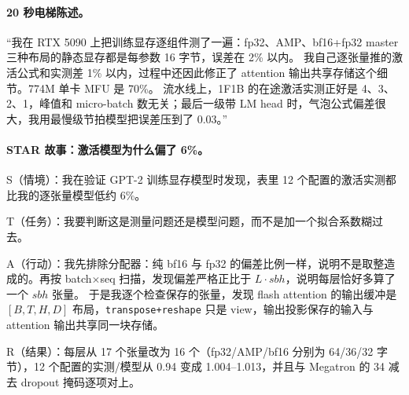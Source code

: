 \documentclass[11pt,a4paper]{ctexart}
\begin{document}
\paragraph{20 秒电梯陈述。}
“我在 RTX 5090 上把训练显存逐组件测了一遍：fp32、AMP、bf16+fp32 master 三种布局的静态显存都是每参数 16 字节，误差在 2\% 以内。
我自己逐张量推的激活公式和实测差 1\% 以内，过程中还因此修正了 attention 输出共享存储这个细节。774M 单卡 MFU 是 70\%。
流水线上，1F1B 的在途激活实测正好是 4、3、2、1，峰值和 micro-batch 数无关；最后一级带 LM head 时，气泡公式偏差很大，我用最慢级节拍模型把误差压到了 0.03。”

\paragraph{STAR 故事：激活模型为什么偏了 6\%。}
S（情境）：我在验证 GPT-2 训练显存模型时发现，表里 12 个配置的激活实测都比我的逐张量模型低约 6\%。

T（任务）：我要判断这是测量问题还是模型问题，而不是加一个拟合系数糊过去。

A（行动）：我先排除分配器：纯 bf16 与 fp32 的偏差比例一样，说明不是取整造成的。再按 batch$\times$seq 扫描，发现偏差严格正比于 $L\cdot sbh$，说明每层恰好多算了一个 $sbh$ 张量。
于是我逐个检查保存的张量，发现 flash attention 的输出缓冲是 $[B,T,H,D]$ 布局，\texttt{transpose+reshape} 只是 view，输出投影保存的输入与 attention 输出共享同一块存储。

R（结果）：每层从 17 个张量改为 16 个（fp32/AMP/bf16 分别为 64/36/32 字节），12 个配置的实测/模型从 0.94 变成 1.004--1.013，并且与 Megatron 的 34 减去 dropout 掩码逐项对上。

\end{document}
